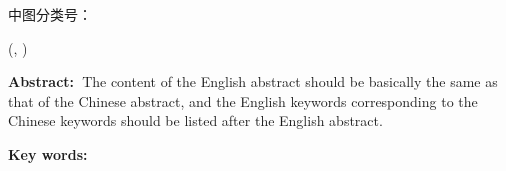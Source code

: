 \vspace*{4pt}
\fontsize{10.5pt}{25pt}
中图分类号：\textrm{\classification}
\vspace*{18pt}

{}
{}

\begin{center}
\fontsize{15.75pt}{\baselineskip}
\vspace*{24pt}
\textrm{\textbf{\sdnutitleen}}  %

\fontsize{12pt}{\baselineskip}
\vspace*{12pt}
\textrm{\sdnuauthorens} %

\textrm{(\sdnucollegeen, \sdnuen)} %

\end{center}

\fontsize{12pt}{25pt}
\textbf{Abstract:~}The content of the English abstract should be basically the same as that of the Chinese abstract, and the English keywords corresponding to the Chinese keywords should be listed after the English abstract.

\vspace*{6pt}
\textbf{Key words:~}\sdnukeywen
